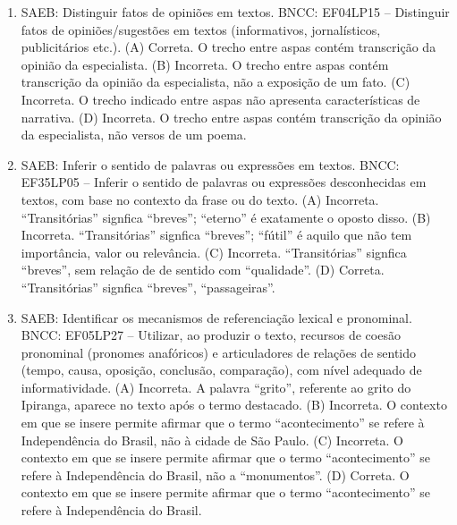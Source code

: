 \begin{enumerate}
\item
SAEB: Distinguir fatos de opiniões em textos. BNCC: EF04LP15 -- Distinguir fatos de opiniões/sugestões em textos (informativos, jornalísticos, publicitários etc.).
(A) Correta. O trecho entre aspas contém transcrição da opinião da especialista. 
(B) Incorreta. O trecho entre aspas contém transcrição da opinião da especialista, não a exposição de um fato. 
(C) Incorreta. O trecho indicado entre aspas não apresenta características de narrativa. 
(D) Incorreta. O trecho entre aspas contém transcrição da opinião da especialista, não versos de um poema.

\item
SAEB: Inferir o sentido de palavras ou expressões em textos. BNCC: EF35LP05 -- Inferir o sentido de palavras ou expressões desconhecidas em textos, com base no contexto da frase ou do texto. 
(A) Incorreta. ``Transitórias'' signfica ``breves''; ``eterno'' é exatamente o oposto disso. 
(B) Incorreta. ``Transitórias'' signfica ``breves''; ``fútil'' é aquilo que não tem importância, valor ou relevância. 
(C) Incorreta.  ``Transitórias'' signfica ``breves'', sem relação de de sentido com ``qualidade''. 
(D) Correta. ``Transitórias'' signfica ``breves'', ``passageiras''.

\item
SAEB: Identificar os mecanismos de referenciação lexical e pronominal. BNCC: EF05LP27 -- Utilizar, ao produzir o texto, recursos de coesão pronominal (pronomes anafóricos) e articuladores de relações de sentido (tempo, causa, oposição, conclusão, comparação), com nível adequado de informatividade.
(A) Incorreta. A palavra ``grito'', referente ao grito do Ipiranga, aparece no texto após o termo destacado. 
(B) Incorreta. O contexto em que se insere permite afirmar que o termo ``acontecimento'' se refere à Independência do Brasil, não à cidade de São Paulo. 
(C) Incorreta. O contexto em que se insere permite afirmar que o termo ``acontecimento'' se refere à Independência do Brasil, não a ``monumentos''. 
(D) Correta. O contexto em que se insere permite afirmar que o termo ``acontecimento'' se refere à Independência do Brasil.


\end{enumerate}
